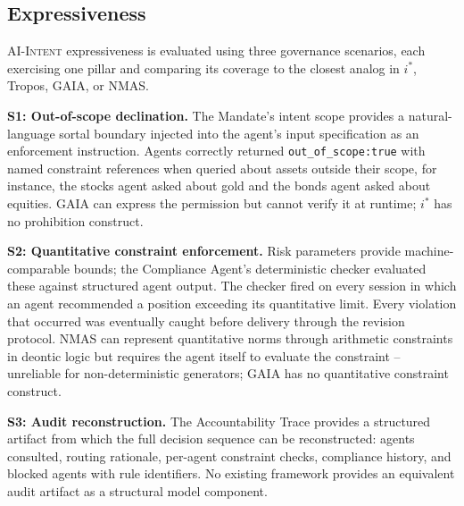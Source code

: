 \documentclass[runningheads]{llncs}
\begin{document}
\subsection{Expressiveness}
\label{sec:expressiveness}

\textsc{AI-Intent} expressiveness is evaluated using three governance scenarios, each exercising one pillar and comparing its coverage to the closest analog in $i^*$, Tropos, GAIA, or NMAS.

\textbf{S1: Out-of-scope declination.} The Mandate's intent scope
provides a natural-language sortal boundary injected into the agent's input specification as an enforcement instruction. Agents correctly returned \texttt{out\_of\_scope:true} with named constraint references when queried about assets outside their scope, for instance, the stocks agent asked about gold and the bonds agent asked about equities.
GAIA can express the permission but cannot verify it at runtime; $i^*$ has no prohibition construct.

\textbf{S2: Quantitative constraint enforcement.} Risk parameters
provide machine-comparable bounds; the Compliance Agent's deterministic checker evaluated these against structured agent output. The checker fired on every session in which an agent recommended a position exceeding its quantitative limit. Every violation that occurred was eventually caught before delivery through the revision protocol. 
NMAS can represent quantitative norms through arithmetic constraints in deontic logic but requires the agent itself to evaluate the constraint -- unreliable for non-deterministic generators; GAIA has no quantitative constraint construct.

\textbf{S3: Audit reconstruction.} The Accountability Trace provides a structured artifact from which the full decision sequence can be reconstructed: agents consulted, routing rationale, per-agent constraint checks, compliance history, and blocked agents with rule identifiers.
No existing framework provides an equivalent audit artifact as a structural model component.
\end{document}
